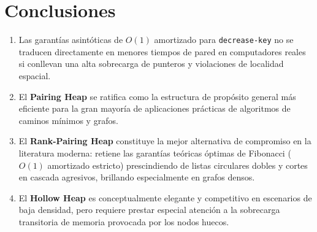 \documentclass[11pt,a4paper]{article}
\begin{document}
\section{Conclusiones}

\begin{enumerate}
    \item Las garantías asintóticas de $O(1)$ amortizado para \texttt{decrease-key} no se traducen directamente en menores tiempos de pared en computadores reales si conllevan una alta sobrecarga de punteros y violaciones de localidad espacial.
    \item El \textbf{Pairing Heap} se ratifica como la estructura de propósito general más eficiente para la gran mayoría de aplicaciones prácticas de algoritmos de caminos mínimos y grafos.
    \item El \textbf{Rank-Pairing Heap} constituye la mejor alternativa de compromiso en la literatura moderna: retiene las garantías teóricas óptimas de Fibonacci ($O(1)$ amortizado estricto) prescindiendo de listas circulares dobles y cortes en cascada agresivos, brillando especialmente en grafos densos.
    \item El \textbf{Hollow Heap} es conceptualmente elegante y competitivo en escenarios de baja densidad, pero requiere prestar especial atención a la sobrecarga transitoria de memoria provocada por los nodos huecos.
\end{enumerate}
\end{document}
